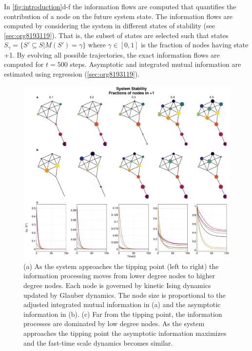 \documentclass[a4paper, 11pt, twocolumn]{article}
\begin{document}
In \cref{fig:introduction}{d-f} the information flows are computed that quantifies the contribution of a node on the future system state. The information flows are computed by considering the system in different states of stability (see \ref{sec:org8193119}). That is, the subset of states are selected such that states $S_{\gamma} = \{S' \subseteq S | M(S') = \gamma\}$ where $\gamma \in [0,1]$ is the fraction of nodes having state +1. By evolving all possible trajectories, the exact information flows are computed for $t=500$ steps. Asymptotic and integrated mutual information are estimated using regression (\ref{sec:org8193119}).


\begin{figure}
\centering
\includegraphics[width=.9\linewidth]{./figures/figure2.pdf}
\caption{\label{fig:kite_res}(a) As the system approaches the tipping point (left to right) the information processing moves from lower degree  nodes to higher degree nodes. Each node is governed by kinetic Ising dynamics updated by Glauber dynamics. The node size is proportional to the adjusted integrated mutual information in (a) and the asymptotic information in (b). (c) Far from the tipping point, the information processes are dominated by low degree nodes. As the system approaches the tipping point the asymptotic information maximizes and the fast-time scale dynamics becomes similar.}
\end{figure}
\end{document}
